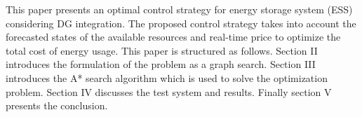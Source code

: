 This paper presents an optimal control strategy for energy storage system (ESS) considering DG integration. The proposed control strategy takes into account the forecasted states of the available resources and real-time price to optimize the total cost of energy usage. This paper is structured as follows. Section II introduces the formulation of the problem as a graph search. Section III introduces the A* search algorithm which is used to solve the optimization problem. Section IV discusses the test system and results. Finally section V presents the conclusion.

